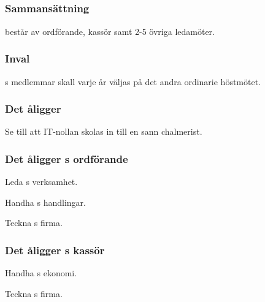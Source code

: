 \subsection{\NOLLKITFULL}
\subsubsection{Sammansättning}
\NOLLKIT{} består av ordförande, kassör samt 2-5 övriga ledamöter.

\subsubsection{Inval}
\NOLLKIT{}s medlemmar skall varje år väljas på det andra ordinarie höstmötet.

\subsubsection{Det åligger \NOLLKIT}
\begin{att}
	\item Se till att IT-nollan skolas in till en sann chalmerist.
\end{att}

\subsubsection{Det åligger \NOLLKIT{}s ordförande}
\begin{att}
	\item Leda \NOLLKIT{}s verksamhet.
	\item Handha \NOLLKIT{}s handlingar.
	\item Teckna \NOLLKIT{}s firma.
\end{att}

\subsubsection{Det åligger \NOLLKIT{}s kassör}
\begin{att}
	\item Handha \NOLLKIT{}s ekonomi.
	\item Teckna \NOLLKIT{}s firma.
\end{att}